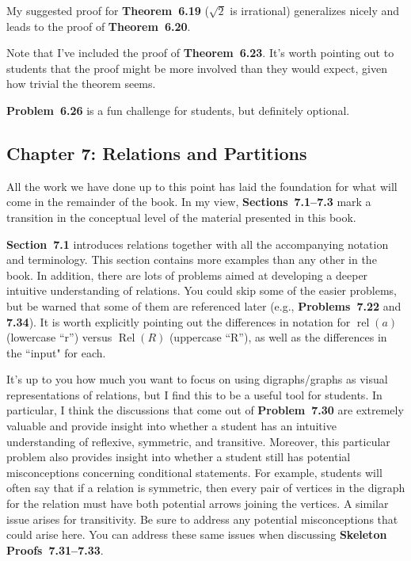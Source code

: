 \documentclass[11pt]{article}%
\newcommand{\blankline}{\pagebreak[2]\vspace{.5\baselineskip}}
\DeclareMathOperator{\rel}{rel}
\DeclareMathOperator{\Rel}{Rel}
\begin{document}
\blankline

My suggested proof for \textbf{Theorem~6.19} ($\sqrt{2}$ is irrational) generalizes nicely and leads to the proof of \textbf{Theorem~6.20}.

\blankline

Note that I've included the proof of \textbf{Theorem~6.23}. It's worth pointing out to students that the proof might be more involved than they would expect, given how trivial the theorem seems.

\blankline

\textbf{Problem~6.26} is a fun challenge for students, but definitely optional. 


\subsection*{Chapter 7: Relations and Partitions}

All the work we have done up to this point has laid the foundation for what will come in the remainder of the book. In my view, \textbf{Sections~7.1--7.3} mark a transition in the conceptual level of the material presented in this book.  

\blankline

\textbf{Section~7.1} introduces relations together with all the accompanying notation and terminology. This section contains more examples than any other in the book.  In addition, there are lots of problems aimed at developing a deeper intuitive understanding of relations.  You could skip some of the easier problems, but be warned that some of them are referenced later (e.g., \textbf{Problems~7.22} and \textbf{7.34}).  It is worth explicitly pointing out the differences in notation for $\rel(a)$ (lowercase ``r'') versus $\Rel(R)$ (uppercase ``R''), as well as the differences in the ``input" for each.

\blankline

It's up to you how much you want to focus on using digraphs/graphs as visual representations of relations, but I find this to be a useful tool for students. In particular, I think the discussions that come out of \textbf{Problem~7.30} are extremely valuable and provide insight into whether a student has an intuitive understanding of reflexive, symmetric, and transitive.  Moreover, this particular problem also provides insight into whether a student still has potential misconceptions concerning conditional statements.  For example, students will often say that if a relation is symmetric, then every pair of vertices in the digraph for the relation must have both potential arrows joining the vertices. A similar issue arises for transitivity. Be sure to address any potential misconceptions that could arise here. You can address these same issues when discussing \textbf{Skeleton Proofs~7.31--7.33}.
\end{document}
